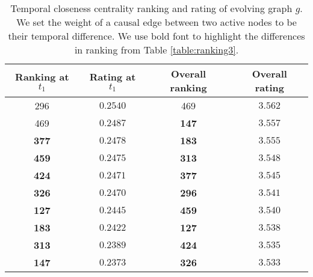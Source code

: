 \documentclass[12pt]{article}
\theoremstyle{definition}
\begin{document}
\begin{table}[h]
  \begin{center}
\begin{tabular}{ c | c | c | c }
  Ranking at $t_1$ & Rating at $t_1$ & Overall ranking & Overall rating \\ \hline
   296 & $0.2540$ & 469 & $3.562$ \\
   469 & $0.2487$ & \textbf{147} & $3.557$ \\
   \textbf{377} & $0.2478$ & \textbf{183} & $3.555$ \\
   \textbf{459} & $0.2475$ & \textbf{313} & $3.548$ \\
   \textbf{424} & $0.2471$ & \textbf{377} & $3.545$ \\
   \textbf{326} & $0.2470$ & \textbf{296} & $3.541$ \\
   \textbf{127} & $0.2445$ & \textbf{459} & $3.540$ \\
   \textbf{183} & $0.2422$ & \textbf{127} & $3.538$ \\
   \textbf{313} & $0.2389$ & \textbf{424} & $3.535$ \\
   \textbf{147} & $0.2373$ & \textbf{326} & $3.533$ \\
\end{tabular}
\end{center}
\caption{Temporal closeness centrality ranking and rating of evolving graph $g$.
We set the weight of a causal edge between two active nodes to be their temporal difference.
We use bold font to highlight the differences in ranking from Table \ref{table:ranking3}.}
\label{table:ranking4}
\end{table}



%
%
%
%
%
%
%
%
\end{document}
